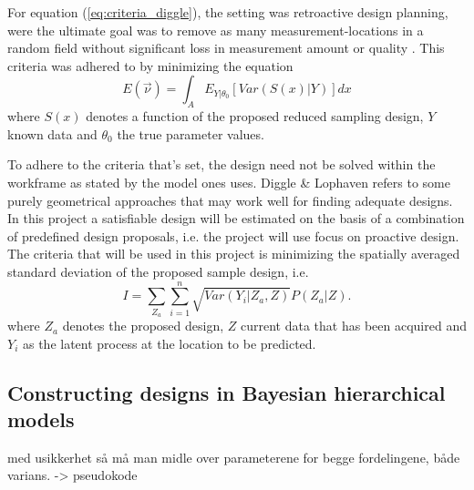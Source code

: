 For equation (\ref{eq:criteria_diggle}), the setting was retroactive design planning, were the ultimate goal was to remove as many measurement-locations in a random field without significant loss in measurement amount or quality \cite{DiggleEtAl}. This criteria was adhered to by minimizing the equation 
\begin{equation} \label{eq:criteria_diggle}
E(\vec{\nu}) = \int_A E_{Y|\theta_0} [Var(S(x)|Y)]dx
\end{equation}
where $S(x)$ denotes a function of the proposed reduced sampling design, $Y$ known data and $\theta_0$ the true parameter values.

To adhere to the criteria that's set, the design need not be solved within the workframe as stated by the model ones uses. Diggle \& Lophaven \cite{DiggleEtAl} refers to some purely geometrical approaches that may work well for finding adequate designs. In this project a satisfiable design will be estimated on the basis of a combination of predefined design proposals, i.e. the project will use focus on proactive design. The criteria that will be used in this project is minimizing the spatially averaged standard deviation of the proposed sample design, i.e. 
\begin{equation} \label{eq:criteria}
I = \sum_{Z_a} \sum_{i=1}^n \sqrt{ Var (Y_i | Z_a, Z) } P(Z_a | Z) .
\end{equation}
where $Z_a$ denotes the proposed design, $Z$ current data that has been acquired and $Y_i$ as the latent process at the location to be predicted. 

\subsection{Constructing designs in Bayesian hierarchical models}

med usikkerhet så må man midle over parameterene for begge fordelingene, både varians. -> pseudokode
